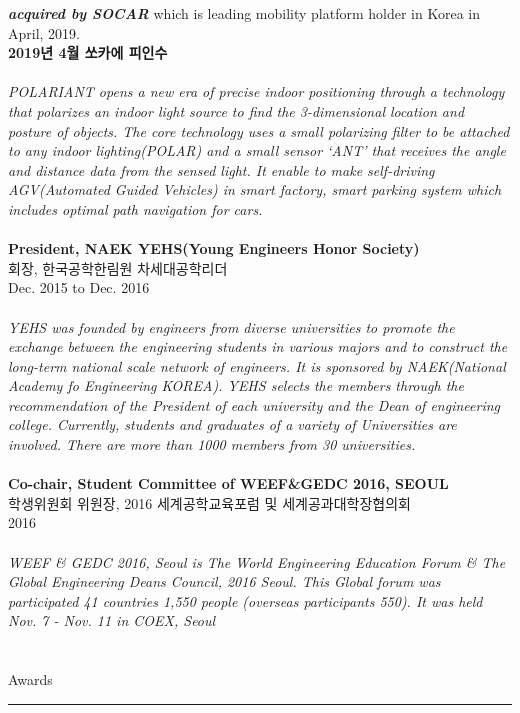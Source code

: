 \documentclass[letterpaper,11pt,oneside]{article}
\begin{document}
\textbf{\emph{acquired by SOCAR}} which is leading mobility platform holder in Korea in April, 2019. \\
\textbf{2019년 4월 쏘카에 피인수}\\
\\
\emph{POLARIANT opens a new era of precise indoor positioning through a technology that polarizes an indoor light source to find the 3-dimensional location and posture of objects. The core technology uses a small polarizing filter to be attached to any indoor lighting(POLAR) and a small sensor ‘ANT’ that receives the angle and distance data from the sensed light. It enable to make self-driving AGV(Automated Guided Vehicles) in smart factory, smart parking system which includes optimal path navigation for cars.}\\
\\
\textbf{President, NAEK YEHS(Young Engineers Honor Society)}\\
회장, 한국공학한림원 차세대공학리더 \\
Dec. 2015 to Dec. 2016 \\
\\
\emph{YEHS was founded by engineers from diverse universities to promote the exchange between the engineering students in various majors and to construct the long-term national scale network of engineers. It is sponsored by NAEK(National Academy fo Engineering KOREA). YEHS selects the members through the recommendation of the President of each university and the Dean of engineering college. Currently, students and graduates of a variety of Universities are involved. There are more than 1000 members from 30 universities.} \\
\\
\textbf{Co-chair, Student Committee of WEEF\&GEDC 2016, SEOUL}\\
학생위원회 위원장, 2016 세계공학교육포럼 및 세계공과대학장협의회 \\
2016 \\
\\
\emph{WEEF \& GEDC 2016, Seoul is The World Engineering Education Forum \& The Global Engineering Deans Council, 2016 Seoul. This Global forum was participated 41 countries 1,550 people (overseas participants 550). It was held Nov. 7 - Nov. 11 in COEX, Seoul}\\
\\
\\
 \Large{Awards}   \\
 \noindent\rule{8cm}{0.4pt}\\
 \\
\end{document}
